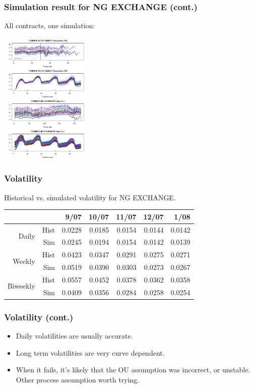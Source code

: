 \documentclass[10pt]{beamer}
\begin{document}
\frame
{
  \frametitle{Simulation result for NG EXCHANGE (cont.)}
All contracts, one simulation:
\begin{center}
  \includegraphics[height=2.5in]{figures/ng-exchange-allmon.png}
\end{center}
}



\frame
{
  \frametitle{Volatility}
Historical vs. simulated  volatility for NG EXCHANGE. 
\begin{table}[htbp]
\begin{center}
\begin{tabular}{r|rrrrrr}
\hline
& & 9/07 & 10/07 & 11/07 & 12/07 & 1/08 \\
  \hline
  \multirow{2}{*}{Daily} & 
  Hist & 0.0228 &  0.0185 &   0.0154 &  0.0144 &  0.0142  \\
 & Sim & 0.0245 &   0.0194 &   0.0154 &  0.0142  & 0.0139 \\ \hline \hline
  \multirow{2}{*}{Weekly} & 
  Hist & 0.0423 &   0.0347 & 0.0291 &  0.0275 &  0.0271 \\
   & Sim & 0.0519 &   0.0390 &   0.0303 &  0.0273 &   0.0267 \\ \hline \hline 
  \multirow{2}{*}{Biweekly} & 
  Hist & 0.0557  & 0.0452 &   0.0378 &   0.0362 &   0.0358 \\
  & Sim & 0.0409 &   0.0356 &   0.0284 &   0.0258 &   0.0254  \\
   \hline
\end{tabular}
\end{center}
\label{tbl-ng-vol}
\end{table}
}


\frame
{
  \frametitle{Volatility (cont.)}
\begin{itemize}
\item Daily volatilities are usually accurate.
\item Long term volatilities are very curve dependent. 
\item When it fails, it's likely that the OU assumption was incorrect,
or unstable. Other process assumption worth trying. 
\end{itemize}
}
\end{document}
